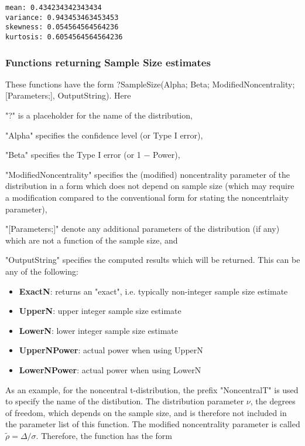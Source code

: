 \begin{verbatim}
mean: 0.434234342343434
variance: 0.943453463453453
skewness: 0.054564564564236
kurtosis: 0.6054564564564236
\end{verbatim}









\newpage
\subsubsection{Functions returning Sample Size estimates}
\label{Functions returning Sample Size estimates}
These functions have the form \textsf{?SampleSize(Alpha; Beta; ModifiedNoncentrality; [Parameters;],  OutputString)}.
Here 

"?" is a placeholder for the name of the distribution, 

"Alpha" specifies the confidence level (or Type I error), 

"Beta" specifies the Type I error (or 1 $-$ Power), 

"ModifiedNoncentrality" specifies the (modified) noncentrality parameter of the distribution in a form which does not depend on sample size (which may require a modification compared to the conventional form for stating the noncentrlaity parameter), 

"[Parameters;]" denote any additional parameters of the distribution (if any) which are not a function of the sample size, and 

"OutputString" specifies the computed results which will be returned. This can be any of the following:

\begin{itemize}
	\item \textbf{ExactN}: returns an "exact", i.e. typically non-integer sample size estimate 
	\item \textbf{UpperN}: upper integer sample size estimate
	\item \textbf{LowerN}: lower integer sample size estimate
	\item \textbf{UpperNPower}: actual power when using UpperN
	\item \textbf{LowerNPower}: actual power when using LowerN
\end{itemize}


\vspace{0.3cm}
As an example, for the noncentral  t-distribution, the prefix "NoncentralT" is used to specify the name of the distibution. The distribution parameter $\nu$, the degrees of freedom, which depends on the sample size, and is therefore not included in the parameter list of this function. The modified noncentrality parameter is called $\tilde{\rho} = \Delta/\sigma$. Therefore, the function has the form

